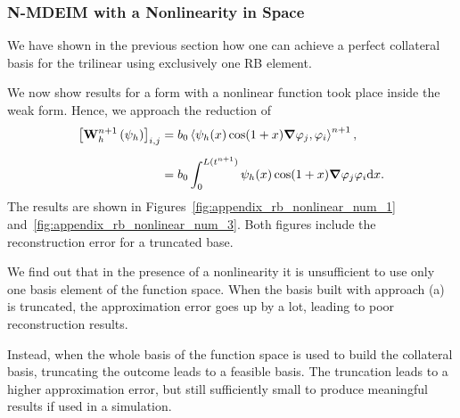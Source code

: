 \documentclass[../../thesis.tex]{subfiles}
\newcommand{\inner}[2]{\left<#1, #2\right>}
\newcommand{\Ah}[1]{\ensuremath{\vb{#1}^{n+1}_h}}
\begin{document}
\subsubsection{N-MDEIM with a Nonlinearity in Space}
We have shown in the previous section how 
one can achieve a perfect collateral basis for the trilinear using exclusively one RB element.

We now show results for a form with a nonlinear function took place inside the weak form.
Hence, we approach the reduction of
\begin{equation}
    \begin{split}
        \qty[\Ah{W}\left(\psi_{h}\right)]_{i,j}
        &= b_0 \inner{\psi_h(x) \cos(1+x) \grad \varphi_j}{\varphi_i}^{n+1},
        \\[2mm]
        &= b_0 \int_{0}^{L(t^{n+1})} \psi_h(x) \cos(1+x) \grad \varphi_j \varphi_i \dd x.
    \end{split}
\end{equation}
The results are shown in Figures~\ref{fig:appendix_rb_nonlinear_num_1} 
and~\ref{fig:appendix_rb_nonlinear_num_3}.
Both figures include the reconstruction error for a truncated base.

We find out that in the presence of a nonlinearity it is unsufficient to use only 
one basis element of the function space. 
When the basis built with approach (a) is truncated, the approximation error goes up by a lot,
leading to poor reconstruction results.

Instead, when the whole basis of the function space is used to build the collateral basis,
truncating the outcome leads to a feasible basis. 
The truncation leads to a higher approximation error, but still sufficiently small to produce
meaningful results if used in a simulation.    
\end{document}

